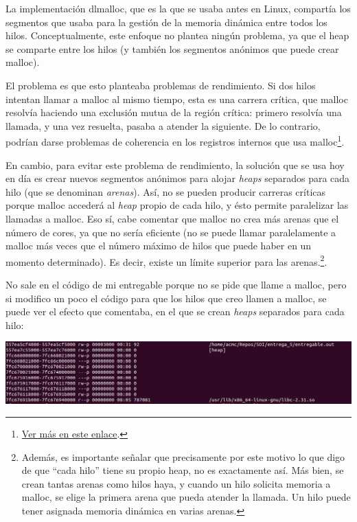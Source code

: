 \documentclass[a4paper]{article}
\begin{document}
La implementación {\ttfamily dlmalloc}, que es la que se usaba antes en Linux, compartía los segmentos que usaba para la gestión de la memoria dinámica entre todos los hilos. Conceptualmente, este enfoque no plantea ningún problema, ya que el heap se comparte entre los hilos (y también los segmentos anónimos que puede crear {\ttfamily malloc}).

El problema es que esto planteaba problemas de rendimiento. Si dos hilos intentan llamar a {\ttfamily malloc} al mismo tiempo, esta es una carrera crítica, que {\ttfamily malloc} resolvía haciendo una exclusión mutua de la región crítica: primero resolvía una llamada, y una vez resuelta, pasaba a atender la siguiente. De lo contrario, podrían darse problemas de coherencia en los registros internos que usa {\ttfamily malloc}\footnote{\href{https://sploitfun.wordpress.com/2015/02/10/understanding-glibc-malloc/}{Ver más en este enlace}.}.

En cambio, para evitar este problema de rendimiento, la solución que se usa hoy en día es crear nuevos segmentos anónimos para alojar \emph{heaps} separados para cada hilo (que se denominan \emph{arenas}). Así, no se pueden producir carreras críticas porque {\ttfamily malloc} accederá al \emph{heap} propio de cada hilo, y ésto permite paralelizar las llamadas a {\ttfamily malloc}. Eso sí, cabe comentar que {\ttfamily malloc} no crea más arenas que el número de cores, ya que no sería eficiente (no se puede llamar paralelamente a {\ttfamily malloc} más veces que el número máximo de hilos que puede haber en un momento determinado). Es decir, existe un límite superior para las arenas.\footnote{Además, es importante señalar que precisamente por este motivo lo que digo de que ``cada hilo'' tiene su propio heap, no es exactamente así. Más bien, se crean tantas arenas como hilos haya, y cuando un hilo solicita memoria a {\ttfamily malloc}, se elige la primera arena que pueda atender la llamada. Un hilo puede tener asignada memoria dinámica en varias arenas.}.

No sale en el código de mi entregable porque no se pide que llame a {\ttfamily malloc}, pero si modifico un poco el código para que los hilos que creo llamen a {\ttfamily malloc}, se puede ver el efecto que comentaba, en el que se crean \emph{heaps} separados para cada hilo:

\includegraphics[scale=0.407]{Hilos_con_malloc.png}
\end{document}
